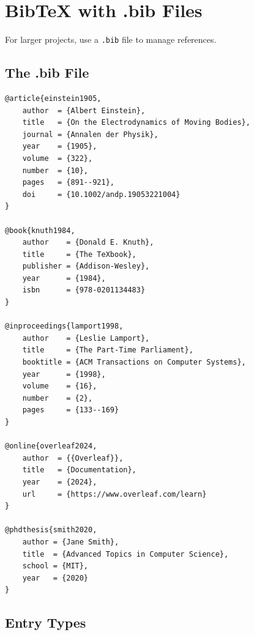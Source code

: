 \section{BibTeX with .bib Files}

For larger projects, use a \texttt{.bib} file to manage references.

\subsection{The .bib File}

\begin{lstlisting}[caption=Sample .bib file (references.bib)]
@article{einstein1905,
    author  = {Albert Einstein},
    title   = {On the Electrodynamics of Moving Bodies},
    journal = {Annalen der Physik},
    year    = {1905},
    volume  = {322},
    number  = {10},
    pages   = {891--921},
    doi     = {10.1002/andp.19053221004}
}

@book{knuth1984,
    author    = {Donald E. Knuth},
    title     = {The TeXbook},
    publisher = {Addison-Wesley},
    year      = {1984},
    isbn      = {978-0201134483}
}

@inproceedings{lamport1998,
    author    = {Leslie Lamport},
    title     = {The Part-Time Parliament},
    booktitle = {ACM Transactions on Computer Systems},
    year      = {1998},
    volume    = {16},
    number    = {2},
    pages     = {133--169}
}

@online{overleaf2024,
    author  = {{Overleaf}},
    title   = {Documentation},
    year    = {2024},
    url     = {https://www.overleaf.com/learn}
}

@phdthesis{smith2020,
    author = {Jane Smith},
    title  = {Advanced Topics in Computer Science},
    school = {MIT},
    year   = {2020}
}
\end{lstlisting}

\subsection{Entry Types}

